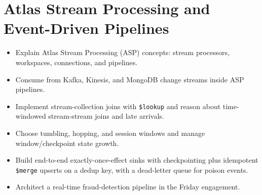 \chapter{Atlas Stream Processing and Event-Driven Pipelines}
%

\begin{objectives}
\begin{itemize}
    \item Explain Atlas Stream Processing (ASP) concepts: stream processors, workspaces, connections, and pipelines.
    \item Consume from Kafka, Kinesis, and MongoDB change streams inside ASP pipelines.
    \item Implement stream-collection joins with \texttt{\$lookup} and reason about time-windowed stream-stream joins and late arrivals.
    \item Choose tumbling, hopping, and session windows and manage window/checkpoint state growth.
    \item Build end-to-end exactly-once-effect sinks with checkpointing plus idempotent \texttt{\$merge} upserts on a dedup key, with a dead-letter queue for poison events.
    \item Architect a real-time fraud-detection pipeline in the Friday engagement.
\end{itemize}
\end{objectives}

